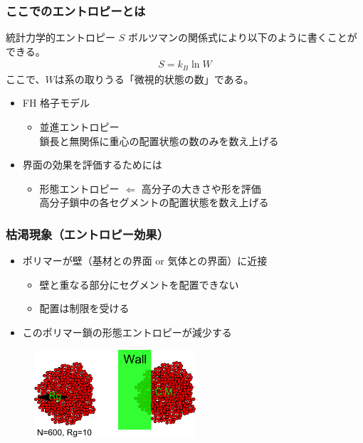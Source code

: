 \documentclass[12pt, dvipdfmx]{beamer}
\begin{document}
\begin{frame}\frametitle{ここでのエントロピーとは}
	\begin{block}{統計力学的エントロピー $S$}
	ボルツマンの関係式により以下のように書くことができる。
	\vspace{-0.5\baselineskip}
	\begin{align*}
	S = k_B \ln W
	\end{align*}
	ここで、$W$は系の取りうる「微視的状態の数」である。
	\end{block}
	\begin{itemize}
	\item FH 格子モデル
		\begin{itemize}
		\item 並進エントロピー\\
		鎖長と無関係に\color{red}重心の配置状態の数のみ\color{black}を数え上げる
		\end{itemize}
	\item 界面の効果を評価するためには
		\begin{itemize}
		\item 形態エントロピー $\Leftarrow$ 高分子の大きさや形を評価\\
		高分子鎖中の\color{red}各セグメントの配置状態\color{black}を数え上げる
		\end{itemize}
	\end{itemize}
\end{frame}
%
\begin{frame}\frametitle{枯渇現象（エントロピー効果）}
	\begin{itemize}
		\item ポリマーが壁（\color{red}基材との界面 or 気体との界面\color{black}）に近接
		\begin{itemize}
			\item 壁と重なる部分にセグメントを配置できない
			\item 配置は\color{red}制限を受ける\color{black}
		\end{itemize}
		\item このポリマー鎖の\color{red}形態エントロピーが減少\color{black}する
	\end{itemize}

	\begin{figure}[htbp]
		\begin{center}
			\includegraphics[width=60mm]{polymer_wall.pdf}
		\end{center}
	\end{figure}

\end{frame}
\end{document}

